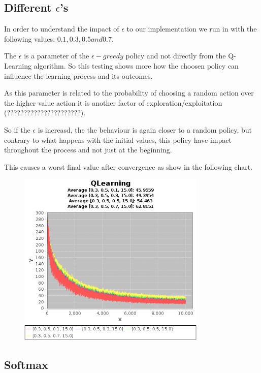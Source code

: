\documentclass{article}
\begin{document}
\subsection{Different $\epsilon$'s}
In order to understand the impact of $\epsilon$ to our implementation we run
in with the following values:
$0.1, 0.3, 0.5 and 0.7$.

The $\epsilon$ is a parameter of the $\epsilon-greedy$ policy and not directly
from the Q-Learning algorithm. So this testing shows more how the choosen policy can
influence the learning process and its outcomes. 

As this parameter is related to the probability of choosing a random action over
the higher value action it is another factor of exploration/exploitation
(??????????????????????).

So if the $\epsilon$ is increasd, the the behaviour is again closer to a random
policy, but contrary to what happens with the initial values, this policy have
impact throughout the process and not just at the beginning.

This causes a worst final value after convergence as show in the following
chart.

\begin{figure}[h]
\centering
\includegraphics[width=0.8\textwidth]{res/alpha_03_gama_05_epsilon_01_to_07_IV_15.png}
\end{figure}

\subsection{Softmax}
\label{softmax}
\end{document}
